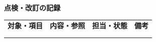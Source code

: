 \documentclass[11pt,a4paper]{article}
\begin{document}
\par{}\noindent\textbf{点検・改訂の記録}\par\vspace{1mm}
{\fontsize{8.5}{13}\selectfont
\begin{tabularx}{\linewidth}{@{}XXXX@{}}
\textbf{対象・項目} & \textbf{内容・参照} & \textbf{担当・状態} & \textbf{備考}\\[2mm]
\strut & \strut & \strut & \strut\\[5mm]
\strut & \strut & \strut & \strut\\[5mm]
\end{tabularx}
}\vspace{2mm}\par
\end{document}
